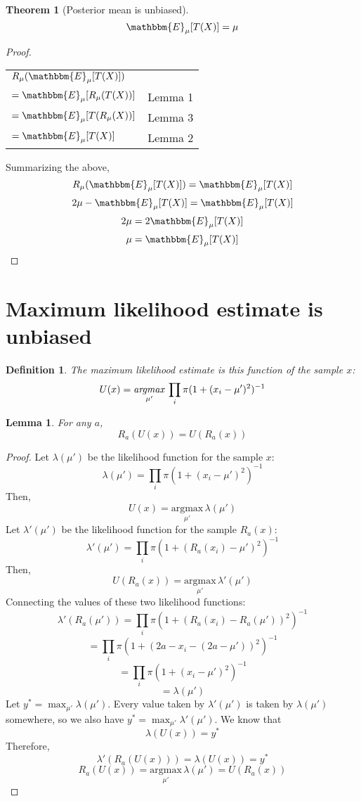 \documentclass{article}
\newtheorem{lemma}{Lemma}
\newtheorem{theorem}{Theorem}
\newtheorem{definition}{Definition}
\newcommand{\condexp}[2]{\mathbbm{E}_{#1}[#2]}
\newcommand{\argmax}[1]{\underset{#1}{\text{argmax}}\,}
\begin{document}
\begin{theorem}[Posterior mean is unbiased]$$\condexp{\mu}{T(X)}=\mu$$\end{theorem}
\begin{proof}
$$$$

\begin{center}
\begin{tabular}{l l}
$R_\mu(\condexp{\mu}{T(X)})$ & \\
$=\condexp{\mu}{R_\mu(T(X))}$ & Lemma 1 \\
$ = \condexp{\mu}{T(R_\mu(X))}$ & Lemma 3 \\
$ = \condexp{\mu}{T(X)}$ & Lemma 2
\end{tabular}
\end{center}

Summarizing the above,
$$R_\mu(\condexp{\mu}{T(X)}) = \condexp{\mu}{T(X)}$$
$$2\mu - \condexp{\mu}{T(X)} = \condexp{\mu}{T(X)}$$
$$2\mu = 2\condexp{\mu}{T(X)}$$
$$\mu = \condexp{\mu}{T(X)}$$
\end{proof}

\section{Maximum likelihood estimate is unbiased}
\begin{definition} The maximum likelihood estimate is this function of the sample $x$:
$$U(x) = \underset{\mu'}{\text{\emph{argmax}}} \, \prod_i \pi (1 + (x_i-\mu')^2)^{-1}$$
\end{definition}

\begin{lemma} For any $a$, $$R_a(U(x)) = U(R_a(x))$$ \end{lemma}
\begin{proof}
Let $\lambda(\mu')$ be the likelihood function for the sample $x$:
$$\lambda(\mu') = \prod_i \pi(1 + (x_i-\mu')^2)^{-1}$$
Then,
$$U(x) = \argmax{\mu'} \lambda(\mu')$$
Let $\lambda'(\mu')$ be the likelihood function for the sample $R_a(x)$:
$$\lambda'(\mu') = \prod_i \pi(1 + (R_a(x_i)-\mu')^2)^{-1}$$
Then,
$$U(R_a(x)) = \argmax{\mu'} \lambda'(\mu')$$
Connecting the values of these two likelihood functions:
$$\lambda'(R_a(\mu')) = \prod_i \pi (1 + (R_a(x_i) - R_a(\mu'))^2)^{-1}$$
$$=\prod_i \pi (1 + (2a-x_i - (2a-\mu'))^2)^{-1}$$
$$=\prod_i \pi (1 + (x_i - \mu')^2)^{-1}$$
$$=\lambda(\mu')$$
Let $y^*=\max_{\mu'} \lambda(\mu')$. Every value taken by $\lambda'(\mu')$ is taken by $\lambda(\mu')$ somewhere, so we also have $y^*=\max_{\mu'} \lambda'(\mu')$. We know that
$$\lambda(U(x)) = y^*$$
Therefore,
$$\lambda'(R_a(U(x))) = \lambda(U(x)) = y^*$$
$$R_a(U(x)) = \argmax{\mu'} \lambda(\mu') = U(R_a(x))$$
\end{proof}
\end{document}
